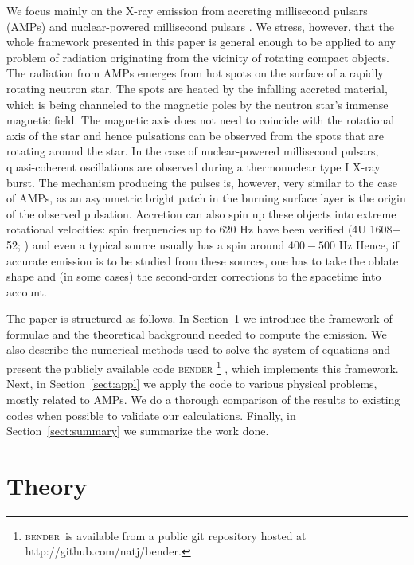 \documentclass[iop, usenatbib]{emulateapj}
\begin{document}
We focus mainly on the X-ray emission from accreting millisecond pulsars (AMPs) \citep{WvdK98, PW12} and nuclear-powered millisecond pulsars \citep{Watts12}.
We stress, however, that the whole framework presented in this paper is general enough to be applied to any problem of radiation originating from the vicinity of rotating compact objects. 
The radiation from AMPs emerges from hot spots on the surface of a rapidly rotating neutron star. The spots are heated by the infalling accreted material, which is being channeled to the magnetic poles by the neutron star's immense magnetic field.
The magnetic axis does not need to coincide with the rotational axis of the star and hence pulsations can be observed from the spots that are rotating around the star.
In the case of nuclear-powered millisecond pulsars, quasi-coherent oscillations are observed during a thermonuclear type I X-ray burst.
The mechanism producing the pulses is, however, very similar to the case of AMPs, as an asymmetric bright patch in the burning surface layer is the origin of the observed pulsation.
Accretion can also spin up these objects into extreme rotational velocities: spin frequencies up to 620 Hz have been verified (4U 1608$-$52; \citealt{MC02}) and even a typical source usually has a spin around $400-500$ Hz \citep{Watts12, PTR14}
Hence, if accurate emission is to be studied from these sources, one has to take the oblate shape and (in some cases) the second-order corrections to the spacetime into account.

The paper is structured as follows.
In Section~\ref{sect:theory} we introduce the framework of formulae and the theoretical background needed to compute the emission.
We also describe the numerical methods used to solve the system of equations and present the publicly available code \textsc{bender}%
\footnote{\textsc{bender}~is available from a public git repository hosted at http://github.com/natj/bender.}
, which implements this framework.
Next, in Section~\ref{sect:appl} we apply the code to various physical problems, mostly related to AMPs.
We do a thorough comparison of the results to existing codes when possible to validate our calculations.
Finally, in Section~\ref{sect:summary} we summarize the work done.




\section{Theory}\label{sect:theory}
\end{document}
